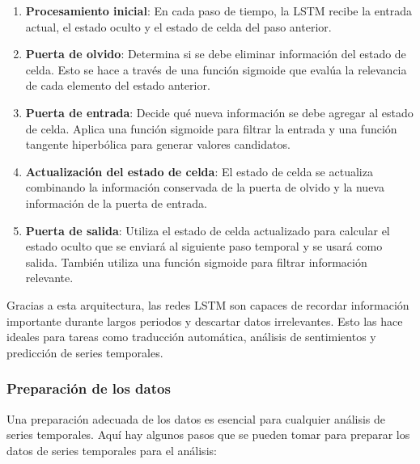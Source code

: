 \documentclass[11pt]{article}
\begin{document}
\begin{enumerate}
\item \textbf{\textbf{Procesamiento inicial}}: En cada paso de tiempo, la LSTM recibe
la entrada actual, el estado oculto y el estado de celda del paso
anterior.

\item \textbf{\textbf{Puerta de olvido}}: Determina si se debe eliminar información del
estado de celda. Esto se hace a través de una función sigmoide que
evalúa la relevancia de cada elemento del estado anterior.

\item \textbf{\textbf{Puerta de entrada}}: Decide qué nueva información se debe agregar
al estado de celda. Aplica una función sigmoide para filtrar la
entrada y una función tangente hiperbólica para generar valores
candidatos.

\item \textbf{\textbf{Actualización del estado de celda}}: El estado de celda se
actualiza combinando la información conservada de la puerta de
olvido y la nueva información de la puerta de entrada.

\item \textbf{\textbf{Puerta de salida}}: Utiliza el estado de celda actualizado para
calcular el estado oculto que se enviará al siguiente paso temporal
y se usará como salida. También utiliza una función sigmoide para
filtrar información relevante.
\end{enumerate}

Gracias a esta arquitectura, las redes LSTM son capaces de recordar
información importante durante largos periodos y descartar datos
irrelevantes. Esto las hace ideales para tareas como traducción
automática, análisis de sentimientos y predicción de series
temporales.

\subsubsection{Preparación de los datos}
\label{sec:org8967c37}
Una preparación adecuada de los datos es esencial para cualquier
análisis de series temporales. Aquí hay algunos pasos que se pueden
tomar para preparar los datos de series temporales para el análisis:
\end{document}
